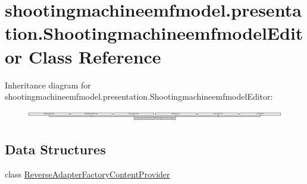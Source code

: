 \hypertarget{classshootingmachineemfmodel_1_1presentation_1_1_shootingmachineemfmodel_editor}{\section{shootingmachineemfmodel.\-presentation.\-Shootingmachineemfmodel\-Editor Class Reference}
\label{classshootingmachineemfmodel_1_1presentation_1_1_shootingmachineemfmodel_editor}
}
Inheritance diagram for shootingmachineemfmodel.\-presentation.\-Shootingmachineemfmodel\-Editor\-:\begin{figure}[H]
\begin{center}
\leavevmode
\includegraphics[height=0.438185cm]{classshootingmachineemfmodel_1_1presentation_1_1_shootingmachineemfmodel_editor}
\end{center}
\end{figure}
\subsection*{Data Structures}
\begin{DoxyCompactItemize}
\item 
class \hyperlink{classshootingmachineemfmodel_1_1presentation_1_1_shootingmachineemfmodel_editor_1_1_reverse_adapter_factory_content_provider}{Reverse\-Adapter\-Factory\-Content\-Provider}
\end{DoxyCompactItemize}
